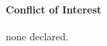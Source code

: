 \documentclass{bioinfo}
\begin{document}
\paragraph{Conflict of Interest\textcolon} none declared.

%
%
%
%
%
%
%
%
%




\end{document}
